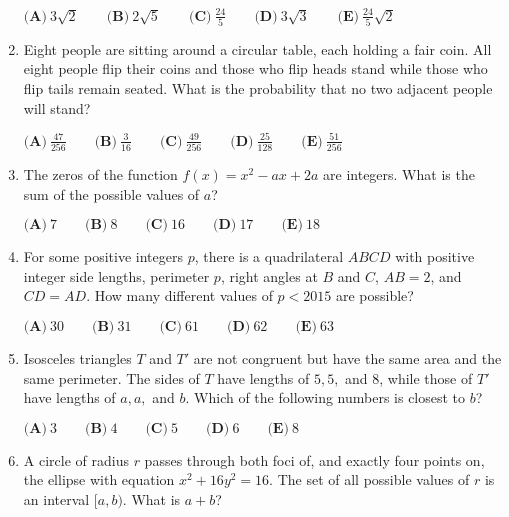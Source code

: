 \documentclass{article}
\begin{document}
\begin{enumerate}[label=\arabic*., itemsep=0.5em]
\( \textbf{(A)}\ 3\sqrt{2}\qquad\textbf{(B)}\ 2\sqrt{5}\qquad\textbf{(C)}\ \frac{24}{5}\qquad\textbf{(D)}\ 3\sqrt{3}\qquad\textbf{(E)}\ \frac{24}{5}\sqrt{2}\)\par \vspace{0.5em}\item Eight people are sitting around a circular table, each holding a fair coin. All eight people flip their coins and those who flip heads stand while those who flip tails remain seated. What is the probability that no two adjacent people will stand?

\( \textbf{(A)}\ \frac{47}{256} \qquad\textbf{(B)}\ \frac{3}{16} \qquad\textbf{(C)}\ \frac{49}{256} \qquad\textbf{(D)}\ \frac{25}{128} \qquad\textbf{(E)}\ \frac{51}{256}\)\par \vspace{0.5em}\item The zeros of the function \(f(x) = x^2-ax+2a\) are integers. What is the sum of the possible values of \(a\)?

\( \textbf{(A)}\ 7 \qquad\textbf{(B)}\ 8 \qquad\textbf{(C)}\ 16 \qquad\textbf{(D)}\ 17 \qquad\textbf{(E)}\ 18\)\par \vspace{0.5em}\item For some positive integers \(p\), there is a quadrilateral \(ABCD\) with positive integer side lengths, perimeter \(p\), right angles at \(B\) and \(C\), \(AB=2\), and \(CD=AD\). How many different values of \(p<2015\) are possible?

\( \textbf{(A)}\ 30 \qquad\textbf{(B)}\ 31 \qquad\textbf{(C)}\ 61 \qquad\textbf{(D)}\ 62 \qquad\textbf{(E)}\ 63\)\par \vspace{0.5em}\item Isosceles triangles \(T\) and \(T'\) are not congruent but have the same area and the same perimeter. The sides of \(T\) have lengths of \(5,5,\) and \(8\), while those of \(T'\) have lengths of \(a,a,\) and \(b\). Which of the following numbers is closest to \(b\)?

\( \textbf{(A)}\ 3 \qquad\textbf{(B)}\ 4 \qquad\textbf{(C)}\ 5 \qquad\textbf{(D)}\ 6 \qquad\textbf{(E)}\ 8\)\par \vspace{0.5em}\item A circle of radius \(r\) passes through both foci of, and exactly four points on, the ellipse with equation \(x^2+16y^2=16\). The set of all possible values of \(r\) is an interval \([a,b)\). What is \(a+b\)?


\end{enumerate}
\end{document}
